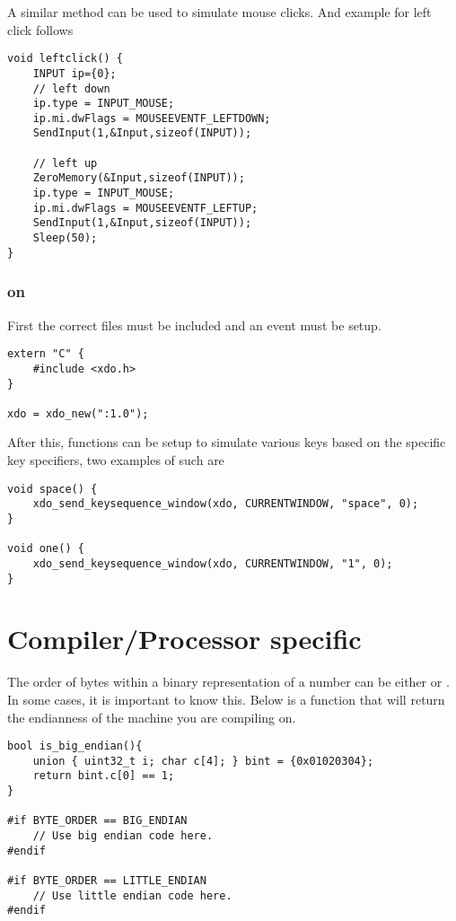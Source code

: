 A similar method can be used to simulate mouse clicks. And example for left click follows
\begin{lstlisting}
void leftclick() {
	INPUT ip={0};
	// left down
	ip.type = INPUT_MOUSE;
	ip.mi.dwFlags = MOUSEEVENTF_LEFTDOWN;
	SendInput(1,&Input,sizeof(INPUT));
	
	// left up
	ZeroMemory(&Input,sizeof(INPUT));
	ip.type = INPUT_MOUSE;
	ip.mi.dwFlags = MOUSEEVENTF_LEFTUP;
	SendInput(1,&Input,sizeof(INPUT));
	Sleep(50);
}
\end{lstlisting}










\subsubsection{ on }

First the correct files must be included and an event must be setup.
\begin{lstlisting}
extern "C" {
	#include <xdo.h>
}

xdo = xdo_new(":1.0");
\end{lstlisting}

After this, functions can be setup to simulate various keys based on the specific key specifiers, two examples of such are
\begin{lstlisting}
void space() {
    xdo_send_keysequence_window(xdo, CURRENTWINDOW, "space", 0);
}

void one() {
	xdo_send_keysequence_window(xdo, CURRENTWINDOW, "1", 0);
}
\end{lstlisting}











\section{Compiler/Processor specific}

The order of bytes within a binary representation of a number can be either  or . In some cases, it is important to know this. Below is a function that will return the endianness of the machine you are compiling on.
\begin{lstlisting}
bool is_big_endian(){
	union { uint32_t i; char c[4]; } bint = {0x01020304};
	return bint.c[0] == 1;
}

#if BYTE_ORDER == BIG_ENDIAN
	// Use big endian code here.
#endif

#if BYTE_ORDER == LITTLE_ENDIAN
	// Use little endian code here.
#endif
\end{lstlisting}

